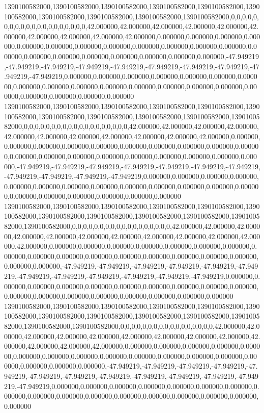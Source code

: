 1390100582000,1390100582000,1390100582000,1390100582000,1390100582000,1390100582000,1390100582000,1390100582000,1390100582000,1390100582000,0,0,0,0,0,0,0,0,0,0,0,0,0,0,0,0,0,0,0,0,42.000000,42.000000,42.000000,42.000000,42.000000,42.000000,42.000000,42.000000,42.000000,42.000000,0.000000,0.000000,0.000000,0.000000,0.000000,0.000000,0.000000,0.000000,0.000000,0.000000,0.000000,0.000000,0.000000,0.000000,0.000000,0.000000,0.000000,0.000000,0.000000,0.000000,-47.949219,-47.949219,-47.949219,-47.949219,-47.949219,-47.949219,-47.949219,-47.949219,-47.949219,-47.949219,0.000000,0.000000,0.000000,0.000000,0.000000,0.000000,0.000000,0.000000,0.000000,0.000000,0.000000,0.000000,0.000000,0.000000,0.000000,0.000000,0.000000,0.000000,0.000000,0.000000
1390100582000,1390100582000,1390100582000,1390100582000,1390100582000,1390100582000,1390100582000,1390100582000,1390100582000,1390100582000,1390100582000,0,0,0,0,0,0,0,0,0,0,0,0,0,0,0,0,0,0,0,42.000000,42.000000,42.000000,42.000000,42.000000,42.000000,42.000000,42.000000,42.000000,42.000000,42.000000,0.000000,0.000000,0.000000,0.000000,0.000000,0.000000,0.000000,0.000000,0.000000,0.000000,0.000000,0.000000,0.000000,0.000000,0.000000,0.000000,0.000000,0.000000,0.000000,-47.949219,-47.949219,-47.949219,-47.949219,-47.949219,-47.949219,-47.949219,-47.949219,-47.949219,-47.949219,-47.949219,0.000000,0.000000,0.000000,0.000000,0.000000,0.000000,0.000000,0.000000,0.000000,0.000000,0.000000,0.000000,0.000000,0.000000,0.000000,0.000000,0.000000,0.000000,0.000000
1390100582000,1390100582000,1390100582000,1390100582000,1390100582000,1390100582000,1390100582000,1390100582000,1390100582000,1390100582000,1390100582000,1390100582000,0,0,0,0,0,0,0,0,0,0,0,0,0,0,0,0,0,0,42.000000,42.000000,42.000000,42.000000,42.000000,42.000000,42.000000,42.000000,42.000000,42.000000,42.000000,42.000000,0.000000,0.000000,0.000000,0.000000,0.000000,0.000000,0.000000,0.000000,0.000000,0.000000,0.000000,0.000000,0.000000,0.000000,0.000000,0.000000,0.000000,0.000000,-47.949219,-47.949219,-47.949219,-47.949219,-47.949219,-47.949219,-47.949219,-47.949219,-47.949219,-47.949219,-47.949219,-47.949219,0.000000,0.000000,0.000000,0.000000,0.000000,0.000000,0.000000,0.000000,0.000000,0.000000,0.000000,0.000000,0.000000,0.000000,0.000000,0.000000,0.000000,0.000000
1390100582000,1390100582000,1390100582000,1390100582000,1390100582000,1390100582000,1390100582000,1390100582000,1390100582000,1390100582000,1390100582000,1390100582000,1390100582000,0,0,0,0,0,0,0,0,0,0,0,0,0,0,0,0,0,42.000000,42.000000,42.000000,42.000000,42.000000,42.000000,42.000000,42.000000,42.000000,42.000000,42.000000,42.000000,42.000000,0.000000,0.000000,0.000000,0.000000,0.000000,0.000000,0.000000,0.000000,0.000000,0.000000,0.000000,0.000000,0.000000,0.000000,0.000000,0.000000,0.000000,-47.949219,-47.949219,-47.949219,-47.949219,-47.949219,-47.949219,-47.949219,-47.949219,-47.949219,-47.949219,-47.949219,-47.949219,-47.949219,0.000000,0.000000,0.000000,0.000000,0.000000,0.000000,0.000000,0.000000,0.000000,0.000000,0.000000,0.000000,0.000000,0.000000,0.000000,0.000000,0.000000
